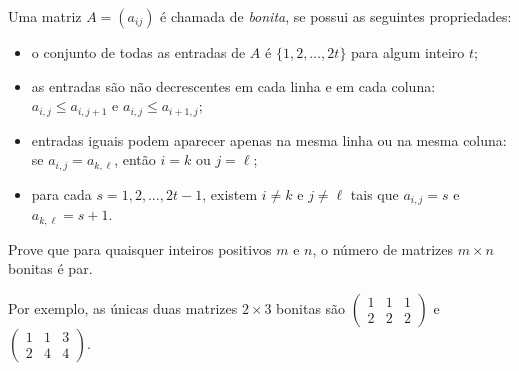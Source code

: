 Uma matriz \(A = (a_{ij})\) é chamada de \emph{bonita}, se possui as seguintes propriedades:
\begin{itemize}
\item[(i)] o conjunto de todas as entradas de \(A\) é \(\{1, 2, \ldots, 2t\}\) para algum inteiro \(t\);
\item[(ii)] as entradas são não decrescentes em cada linha e em cada coluna: \(a_{i,j} \le a_{i,j+1}\) e \(a_{i,j} \le a_{i+1,j}\);
\item[(iii)] entradas iguais podem aparecer apenas na mesma linha ou na mesma coluna: se \(a_{i,j} = a_{k,\ell}\), então \(i = k\) ou \(j = \ell\);
\item[(iv)] para cada \(s = 1, 2, \ldots, 2t-1\), existem \(i \ne k\) e \(j \ne \ell\) tais que \(a_{i,j} = s\) e \(a_{k,\ell} = s+1\).
\end{itemize}

Prove que para quaisquer inteiros positivos \(m\) e \(n\), o número de matrizes \(m \times n\) bonitas é par.

Por exemplo, as únicas duas matrizes \(2 \times 3\) bonitas são \(\begin{pmatrix} 1 & 1 & 1 \\ 2 & 2 & 2 \end{pmatrix}\) e \(\begin{pmatrix} 1 & 1 & 3 \\ 2 & 4 & 4 \end{pmatrix}\).
